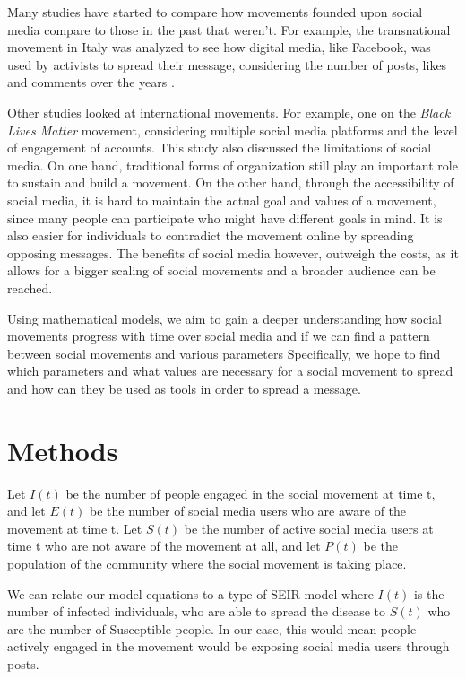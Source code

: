 \documentclass{article}
\begin{document}
    Many studies have started to compare how movements founded upon social media compare to those in the past that weren't\cite{kidd_social_2016}. For example, the transnational movement in Italy was analyzed to see how digital media, like Facebook, was used by activists to spread their message, considering the number of posts, likes and comments over the  years \cite{pavan_digital_2019}. 
    
    Other studies looked at international movements. For example, one on the \textit{Black Lives Matter} movement, considering multiple social media platforms and the level of engagement of accounts. This study also discussed the limitations of social media. On one hand, traditional forms of organization still play an important role to sustain and build a movement. On the other hand, through the accessibility of social media, it is hard to maintain the actual goal and values of a movement, since many people can participate who might have different goals in mind. It is also easier for individuals to contradict the movement online by spreading opposing messages. The benefits of social media however, outweigh the costs, as it allows for a bigger scaling of social movements and a broader audience can be reached. \cite{mundt_scaling_2018}

    
    Using mathematical models, we aim to gain a deeper understanding how social movements progress with time over social media and if we can find a pattern between social movements and various parameters Specifically, we hope to find which parameters and what values are necessary for a social movement to spread and how can they be used as tools in order to spread a message.

    \section{Methods}

    
    Let $I(t)$ be the number of people engaged in the social movement at time t, and let $E(t)$ be the number of social media users who are aware of the movement at time t. Let $S(t)$ be the number of active social media users at time t who are not aware of the movement at all, and let $P(t)$ be the population of the community where the social movement is taking place. 
    
    We can relate our model equations to a type of SEIR model where $I(t)$ is the number of infected individuals, who are able to spread the disease to $S(t)$ who are the number of Susceptible people. In our case, this would mean people actively engaged in the movement would be exposing social media users through posts. 
    
\end{document}
